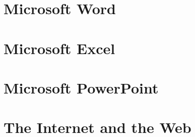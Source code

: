 \documentclass[12pt, a4paper, twoside, openany]{book}
\begin{document}











\part{Microsoft Word}










\part{Microsoft Excel}










\part{Microsoft PowerPoint}








\part{The Internet and the Web}
\end{document}
